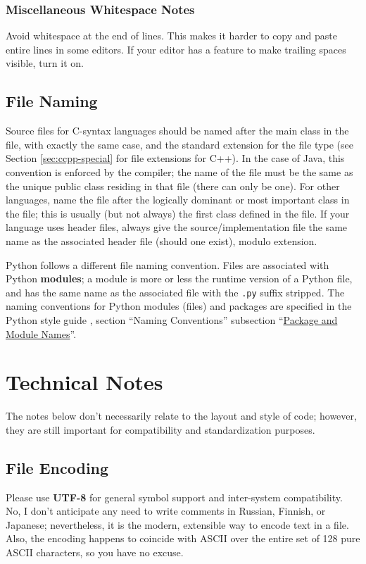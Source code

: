 \documentclass[12pt]{article}
\newcommand{\code}[1]{\texttt{#1}}
\newcommand{\textdef}[1]{\textbf{#1}}
\begin{document}
\subsubsection{Miscellaneous Whitespace Notes}
Avoid whitespace at the end of lines. This makes it harder to copy and paste entire lines in some editors. If your editor has a feature to make trailing spaces visible, turn it on.

\subsection{File Naming}
Source files for C-syntax languages should be named after the main class in the file, with exactly the same case, and the standard extension for the file type (see Section \ref{sec:ccpp-special} for file extensions for C++). In the case of Java, this convention is enforced by the compiler; the name of the file must be the same as the unique public class residing in that file (there can only be one). For other languages, name the file after the logically dominant or most important class in the file; this is usually (but not always) the first class defined in the file. If your language uses header files, always give the source/implementation file the same name as the associated header file (should one exist), modulo extension.

Python follows a different file naming convention. Files are associated with Python \textdef{modules}; a module is more or less the runtime version of a Python file, and has the same name as the associated file with the \code{.py} suffix stripped. The naming conventions for Python modules (files) and packages are specified in the Python style guide \cite{pyguide}, section ``Naming Conventions'' subsection ``\href{http://www.python.org/dev/peps/pep-0008/#package-and-module-names}{Package and Module Names}''.

\section{Technical Notes}
The notes below don't necessarily relate to the layout and style of code; however, they are still important for compatibility and standardization purposes.
\subsection{File Encoding}
Please use \textdef{UTF-8} for general symbol support and inter-system compatibility. No, I don't anticipate any need to write comments in Russian, Finnish, or Japanese; nevertheless, it is the modern, extensible way to encode text in a file. Also, the encoding happens to coincide with ASCII over the entire set of 128 pure ASCII characters, so you have no excuse.
\end{document}
